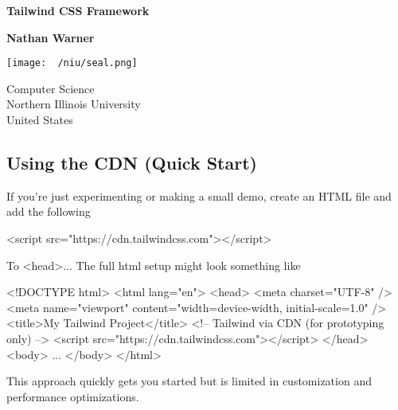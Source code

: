 \documentclass{report}
\title{\Huge{}}
\author{\huge{Nathan Warner}}
\date{\huge{}}
\begin{document}
        \begin{titlepage}
       \begin{center}
           \vspace*{1cm}
    
           \textbf{Tailwind CSS Framework}
    
           \vspace{0.5cm}
            
                
           \vspace{1.5cm}
    
           \textbf{Nathan Warner}
    
           \vfill
                
                
           \vspace{0.8cm}
         
           \texttt{[image: ~/niu/seal.png]}
                
           Computer Science \\
           Northern Illinois University\\
           United States\\
           
                
       \end{center}
    \end{titlepage}
    \tableofcontents
    \pagebreak 
    \bigbreak \noindent 
    \subsection{Using the CDN (Quick Start)}
    \bigbreak \noindent 
    If you’re just experimenting or making a small demo, create an HTML file and add the following 
    \bigbreak \noindent 
    \begin{htmlcode}
        <script src="https://cdn.tailwindcss.com"></script>
    \end{htmlcode}
    \bigbreak \noindent 
    To <head>... The full html setup might look something like
    \bigbreak \noindent 
    \begin{htmlcode}
    <!DOCTYPE html>
    <html lang="en">
      <head>
        <meta charset="UTF-8" />
        <meta name="viewport" content="width=device-width, initial-scale=1.0" />
        <title>My Tailwind Project</title>
        <!-- Tailwind via CDN (for prototyping only) -->
        <script src="https://cdn.tailwindcss.com"></script>
      </head>
      <body>
        ...
      </body>
    </html>
    \end{htmlcode}
    \bigbreak \noindent 
    This approach quickly gets you started but is limited in customization and performance optimizations.
\end{document}
